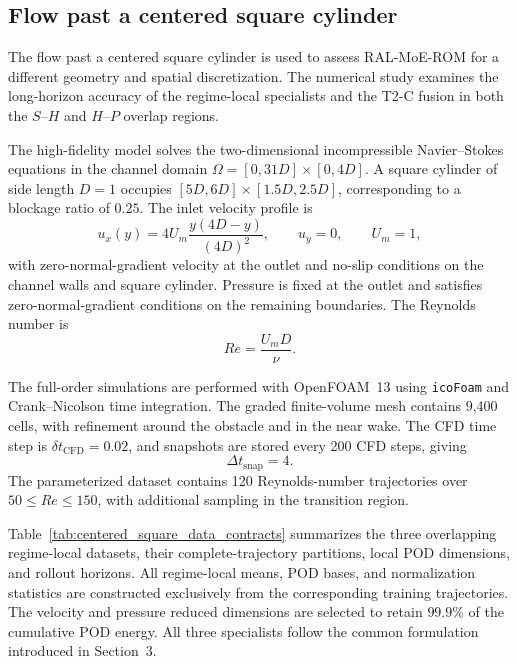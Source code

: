 
\subsection{Flow past a centered square cylinder}
\label{subsec:flow_past_centered_square_cylinder}

The flow past a centered square cylinder is used to assess RAL-MoE-ROM for a
different geometry and spatial discretization. The numerical study examines
the long-horizon accuracy of the regime-local specialists and the T2-C fusion
in both the $S$--$H$ and $H$--$P$ overlap regions.

The high-fidelity model solves the two-dimensional incompressible
Navier--Stokes equations in the channel domain
$\Omega=[0,31D]\times[0,4D]$. A square cylinder of side length $D=1$
occupies $[5D,6D]\times[1.5D,2.5D]$, corresponding to a blockage ratio of
$0.25$. The inlet velocity profile is
\begin{equation}
u_x(y)
=
4U_m\frac{y(4D-y)}{(4D)^2},
\qquad
u_y=0,
\qquad
U_m=1,
\label{eq:centered_square_inlet}
\end{equation}
with zero-normal-gradient velocity at the outlet and no-slip conditions on
the channel walls and square cylinder. Pressure is fixed at the outlet and
satisfies zero-normal-gradient conditions on the remaining boundaries. The
Reynolds number is
\[
Re=\frac{U_mD}{\nu}.
\]


The full-order simulations are performed with OpenFOAM~13 using
\texttt{icoFoam} and Crank--Nicolson time integration. The graded
finite-volume mesh contains 9,400 cells, with refinement around the obstacle
and in the near wake. The CFD time step is
$\delta t_{\mathrm{CFD}}=0.02$, and snapshots are stored every 200 CFD
steps, giving
\begin{equation}
\Delta t_{\mathrm{snap}}=4.
\label{eq:centered_square_snapshot_dt}
\end{equation}
The parameterized dataset contains 120 Reynolds-number trajectories over
$50\le Re\le150$, with additional sampling in the transition region.


Table~\ref{tab:centered_square_data_contracts} summarizes the three
overlapping regime-local datasets, their complete-trajectory partitions,
local POD dimensions, and rollout horizons. All regime-local means, POD
bases, and normalization statistics are constructed exclusively from the
corresponding training trajectories. The velocity and pressure reduced
dimensions are selected to retain $99.9\%$ of the cumulative POD energy.
All three specialists follow the common formulation introduced in
Section~3.

